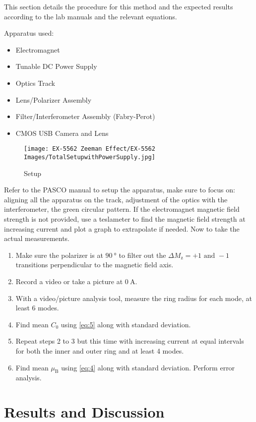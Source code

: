 \documentclass[11pt]{article}
\begin{document}
	This section details the procedure for this method and the expected results according to the lab manuals and the relevant equations.
	\par
	Apparatus used:
	\begin{itemize}
		\item Electromagnet
		\item Tunable DC Power Supply
		\item Optics Track
		\item Lens/Polarizer Assembly
		\item Filter/Interferometer Assembly (Fabry-Perot)
		\item CMOS USB Camera and Lens
	\end{itemize}
	\begin{figure}[!h]
		\centering
		\caption{Setup}
		\label{Apparatus}
		\texttt{[image: EX-5562 Zeeman Effect/EX-5562 Images/TotalSetupwithPowerSupply.jpg]}
	\end{figure}
	Refer to the PASCO manual to setup the apparatus, make sure to focus on: aligning all the apparatus on the track, adjustment of the optics with the interferometer, the green circular pattern. If the electromagnet magnetic field strength is not provided, use a teslameter to find the magnetic field strength at increasing current and plot a graph to extrapolate if needed. Now to take the actual measurements.
	\begin{enumerate}
		\item Make sure the polarizer is at $\qty{90}{\degree}$ to filter out the $\Delta M_\mathrm{z} = +1 \text{ and } -1$ transitions perpendicular to the magnetic field axis.
		\item Record a video or take a picture at $\qty{0}{\ampere}$.
		\item With a video/picture analysis tool, measure the ring radius for each mode, at least 6 modes.
		\item Find mean $C_0$ using \eqref{eq:5} along with standard deviation.
		\item Repeat steps 2 to 3 but this time with increasing current at equal intervals for both the inner and outer ring and at least 4 modes.
		\item Find mean $\mu_\mathrm{B}$ using \eqref{eq:4} along with standard deviation. Perform error analysis.
	\end{enumerate}

\clearpage

	\section{Results and Discussion}
\end{document}
